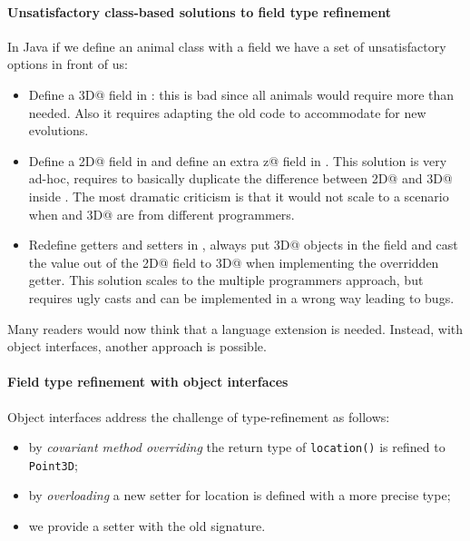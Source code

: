 \paragraph{Unsatisfactory class-based solutions to field type refinement}
In Java if we define an animal class with a field we have a set of
unsatisfactory options in front of us:

\begin{itemize}

\item Define a \Q@Point3D@ field in \Q@Animal@: this is bad since all animals
  would require more than needed.
  Also it requires adapting the old code to accommodate for new evolutions.

\item Define a \Q@Point2D@ field in \Q@Animal@ and define an extra \Q@int z@
  field in \Q@Bird@.  This solution is very ad-hoc, requires to basically
  duplicate the difference between \Q@Point2D@ and \Q@Point3D@ inside \Q@Bird@.
  The most dramatic criticism is that it would not scale to a scenario when
  \Q@Bird@ and \Q@Point3D@ are from different programmers.

\item Redefine getters and setters in \Q@Bird@, always put \Q@Point3D@ objects
  in the field and cast the value out of the \Q@Point2D@ field to \Q@Point3D@
  when implementing the overridden getter.  This solution scales to the multiple
  programmers approach, but requires ugly casts and can be implemented in a
  wrong way leading to bugs.
\end{itemize}

Many readers would now think that a language extension is needed. Instead, with object interfaces, 
another approach is possible.

\paragraph{Field type refinement with object interfaces}
Object interfaces address the challenge of type-refinement as follows:
\begin{itemize}
\item by \emph{covariant method overriding} the return type of
  \texttt{location()} is refined to \texttt{Point3D};
\item by \emph{overloading} a new setter for location is defined with a more
  precise type;
\item we provide a \Q@default@ setter with the old signature.
\end{itemize}

